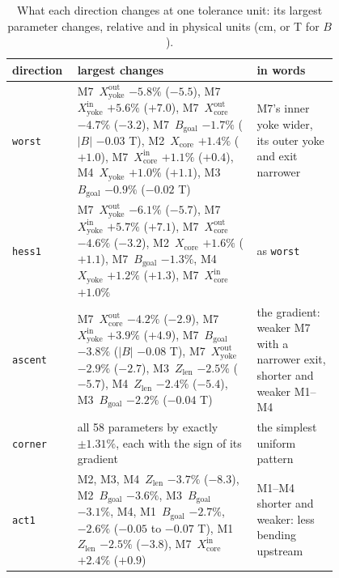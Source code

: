 \documentclass[11pt,a4paper]{article}
\begin{document}
\begin{table}[t]
\centering
\caption{What each direction changes at one tolerance unit: its largest parameter changes,
relative and in physical units (cm, or T for $B$).}
\label{tab:dirs}
\small
\begin{tabular}{l p{0.55\linewidth} p{0.25\linewidth}}
\toprule
direction & largest changes & in words \\
\midrule
\texttt{worst}  & M7~$X_\mathrm{yoke}^\mathrm{out}$ $-5.8\%$ ($-5.5$), M7~$X_\mathrm{yoke}^\mathrm{in}$ $+5.6\%$ ($+7.0$),
                  M7~$X_\mathrm{core}^\mathrm{out}$ $-4.7\%$ ($-3.2$), M7~$B_\mathrm{goal}$ $-1.7\%$ ($|B|$ $-0.03$ T),
                  M2~$X_\mathrm{core}$ $+1.4\%$ ($+1.0$), M7~$X_\mathrm{core}^\mathrm{in}$ $+1.1\%$ ($+0.4$),
                  M4~$X_\mathrm{yoke}$ $+1.0\%$ ($+1.1$), M3~$B_\mathrm{goal}$ $-0.9\%$ ($-0.02$ T)
                & M7's inner yoke wider, its outer yoke and exit narrower \\
\midrule
\texttt{hess1}  & M7~$X_\mathrm{yoke}^\mathrm{out}$ $-6.1\%$ ($-5.7$), M7~$X_\mathrm{yoke}^\mathrm{in}$ $+5.7\%$ ($+7.1$),
                  M7~$X_\mathrm{core}^\mathrm{out}$ $-4.6\%$ ($-3.2$), M2~$X_\mathrm{core}$ $+1.6\%$ ($+1.1$),
                  M7~$B_\mathrm{goal}$ $-1.3\%$, M4~$X_\mathrm{yoke}$ $+1.2\%$ ($+1.3$), M7~$X_\mathrm{core}^\mathrm{in}$ $+1.0\%$
                & as \texttt{worst} \\
\midrule
\texttt{ascent} & M7~$X_\mathrm{core}^\mathrm{out}$ $-4.2\%$ ($-2.9$), M7~$X_\mathrm{yoke}^\mathrm{in}$ $+3.9\%$ ($+4.9$),
                  M7~$B_\mathrm{goal}$ $-3.8\%$ ($|B|$ $-0.08$ T), M7~$X_\mathrm{yoke}^\mathrm{out}$ $-2.9\%$ ($-2.7$),
                  M3~$Z_\mathrm{len}$ $-2.5\%$ ($-5.7$), M4~$Z_\mathrm{len}$ $-2.4\%$ ($-5.4$),
                  M3~$B_\mathrm{goal}$ $-2.2\%$ ($-0.04$ T)
                & the gradient: weaker M7 with a narrower exit, shorter and weaker M1--M4 \\
\midrule
\texttt{corner} & all 58 parameters by exactly $\pm1.31\%$, each with the sign of its gradient
                & the simplest uniform pattern \\
\midrule
\texttt{act1}   & M2, M3, M4~$Z_\mathrm{len}$ $-3.7\%$ ($-8.3$), M2~$B_\mathrm{goal}$ $-3.6\%$, M3~$B_\mathrm{goal}$ $-3.1\%$,
                  M4, M1~$B_\mathrm{goal}$ $-2.7\%$, $-2.6\%$ ($-0.05$ to $-0.07$ T),
                  M1~$Z_\mathrm{len}$ $-2.5\%$ ($-3.8$), M7~$X_\mathrm{core}^\mathrm{in}$ $+2.4\%$ ($+0.9$)
                & M1--M4 shorter and weaker: less bending upstream \\

\end{tabular}
\end{table}
\end{document}
